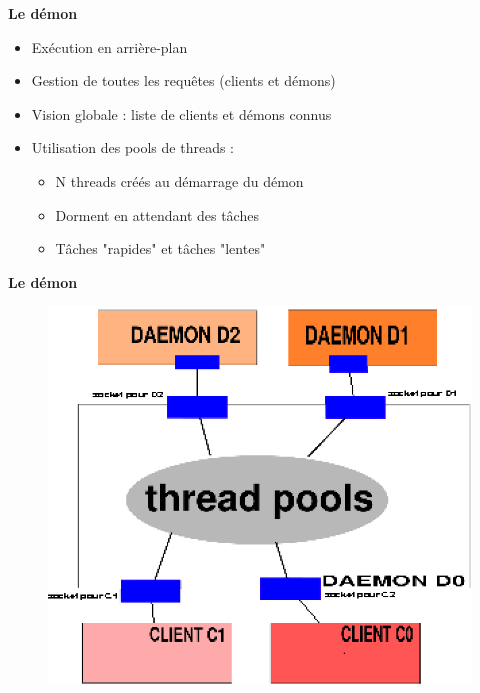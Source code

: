 \documentclass{beamer}
\begin{document}
\begin{frame}
    \textbf{Le démon}
    \begin{itemize}
        \item Exécution en arrière-plan
        \item Gestion de toutes les requêtes (clients et démons)
        \item Vision globale : liste de clients et démons connus
        \item Utilisation des pools de threads :
            \begin{itemize}
                \item N threads créés au démarrage du démon
                \item Dorment en attendant des tâches
                \item Tâches "rapides" et tâches "lentes"
            \end{itemize}
     \end{itemize}
\end{frame}

\begin{frame}
    \textbf{Le démon}
\begin{center}
\begin{figure}[htbp]
    \centering
    \includegraphics[scale=0.8]{archi_daemon.eps}
\end{figure}
\end{center}

\end{frame}
\end{document}
